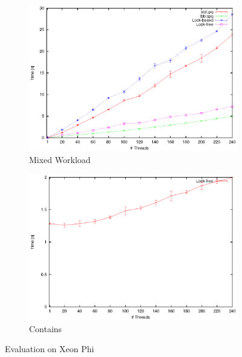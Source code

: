 \begin{figure}
\begin{subfigure}[b]{0.475\columnwidth}
		\centering
		\includegraphics[width=\textwidth]{../plots/xp_mixed/runtime_mixed}
		\caption{Mixed Workload}
		\label{fig:xp_mixed}
	\end{subfigure}
	\hfill
	\begin{subfigure}[b]{0.475\columnwidth}
		\centering
		\includegraphics[width=\textwidth]{../plots/xp_contains/runtime_contains}
		\caption{Contains}
		\label{fig:xp_contains}
	\end{subfigure}
	\caption{Evaluation on Xeon Phi}
	\label{fig:three graphs}
\end{figure}
